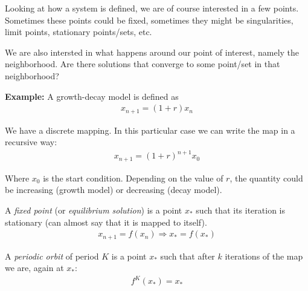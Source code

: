 \noindent Looking at how a system is defined, we are of course interested in a few points. Sometimes these points could be fixed, sometimes they might be singularities, limit points, stationary points/sets, etc.\par
\noindent We are also intersted in what happens around our point of interest, namely the neighborhood. Are there solutions that converge to some point/set in that neighborhood?
\par\bigskip
\noindent\textbf{Example:} A growth-decay model is defined as
\begin{equation*}
  \begin{gathered}
    x_{n+1} = (1+r)x_n
  \end{gathered}
\end{equation*}\par
\noindent We have a discrete mapping. In this particular case we can write the map in a recursive way:
\begin{equation*}
  \begin{gathered}
    x_{n+1} = (1+r)^{n+1}x_0
  \end{gathered}
\end{equation*}\par
\noindent Where $x_0$ is the start condition. Depending on the value of $r$, the quantity could be increasing (growth model) or decreasing (decay model). 
\par\bigskip
\begin{theo}{}
  A \textit{fixed point} (or \textit{equilibrium solution}) is a point $x_*$ such that its iteration is stationary (can almost say that it is mapped to itself).
  \begin{equation*}
    \begin{gathered}
      x_{n+1} = f(x_n)\Rightarrow x_* = f(x_*)
    \end{gathered}
  \end{equation*}
\end{theo}
\par\bigskip
\begin{theo}{}
  A \textit{periodic orbit} of period $K$ is a point $x_*$ such that after $k$ iterations of the map we are, again at $x_*$:
  \begin{equation*}
    \begin{gathered}
      f^K(x_*) = x_*
    \end{gathered}
  \end{equation*}
\end{theo}
\par\bigskip

